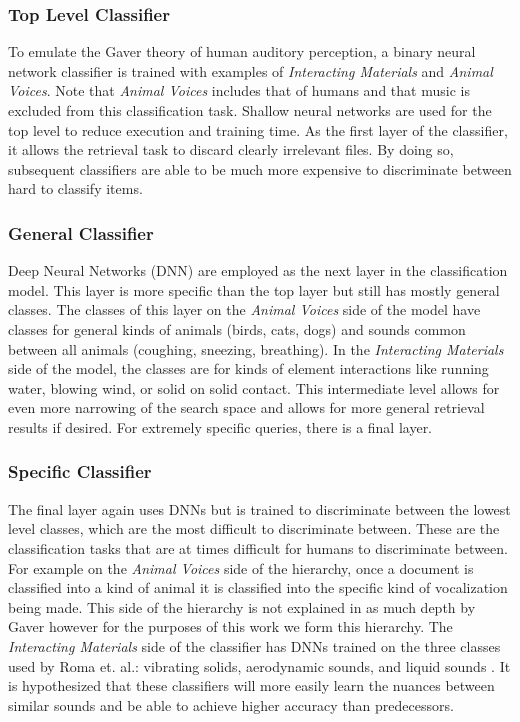 \subsubsection{Top Level Classifier}
To emulate the Gaver theory of human auditory perception, a binary neural network classifier is trained with examples of \textit{Interacting Materials} and \textit{Animal Voices}. Note that \textit{Animal Voices} includes that of humans and that music is excluded from this classification task. Shallow neural networks are used for the top level to reduce execution and training time. As the first layer of the classifier, it allows the retrieval task to discard clearly irrelevant files. By doing so, subsequent classifiers are able to be much more expensive to discriminate between hard to classify items.

\subsubsection{General Classifier}
Deep Neural Networks (DNN) are employed as the next layer in the classification model. This layer is more specific than the top layer but still has mostly general classes. The classes of this layer on the \textit{Animal Voices} side of the model have classes for general kinds of animals (birds, cats, dogs) and sounds common between all animals (coughing, sneezing, breathing). In the \textit{Interacting Materials} side of the model, the classes are for kinds of element interactions like running water, blowing wind, or solid on solid contact. This intermediate level allows for even more narrowing of the search space and allows for more general retrieval results if desired. For extremely specific queries, there is a final layer.

\subsubsection{Specific Classifier}
The final layer again uses DNNs but is trained to discriminate between the lowest level classes, which are the most difficult to discriminate between. These are the classification tasks that are at times difficult for humans to discriminate between. For example on the \textit{Animal Voices} side of the hierarchy, once a document is classified into a kind of animal it is classified into the specific kind of vocalization being made. This side of the hierarchy is not explained in as much depth by Gaver however for the purposes of this work we form this hierarchy. The \textit{Interacting Materials} side of the classifier has DNNs trained on the three classes used by Roma et. al.: vibrating solids, aerodynamic sounds, and liquid sounds \cite{Roma2010}. It is hypothesized that these classifiers will more easily learn the nuances between similar sounds and be able to achieve higher accuracy than predecessors.

